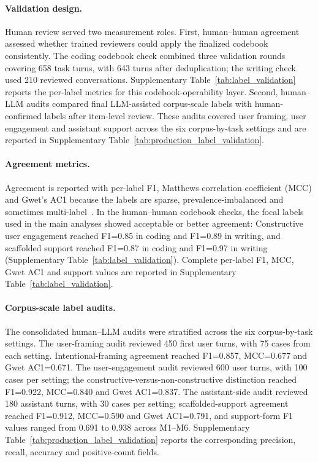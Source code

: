 \paragraph{Validation design.}
Human review served two measurement roles. First, human--human agreement assessed whether trained reviewers could apply the finalized codebook consistently. The coding codebook check combined three validation rounds covering 658 task turns, with 643 turns after deduplication; the writing check used 210 reviewed conversations. Supplementary Table~\ref{tab:label_validation} reports the per-label metrics for this codebook-operability layer. Second, human--LLM audits compared final LLM-assisted corpus-scale labels with human-confirmed labels after item-level review. These audits covered user framing, user engagement and assistant support across the six corpus-by-task settings and are reported in Supplementary Table~\ref{tab:production_label_validation}.

\paragraph{Agreement metrics.}
Agreement is reported with per-label F1, Matthews correlation coefficient (MCC) and Gwet's AC1 because the labels are sparse, prevalence-imbalanced and sometimes multi-label~\cite{matthews1975comparison,gwet2008computing}.  In the human--human codebook checks, the focal labels used in the main analyses showed acceptable or better agreement: Constructive user engagement reached F1=0.85 in coding and F1=0.89 in writing, and scaffolded support reached F1=0.87 in coding and F1=0.97 in writing (Supplementary Table~\ref{tab:label_validation}). Complete per-label F1, MCC, Gwet AC1 and support values are reported in Supplementary Table~\ref{tab:label_validation}.

\paragraph{Corpus-scale label audits.}
The consolidated human--LLM audits were stratified across the six corpus-by-task settings. The user-framing audit reviewed 450 first user turns, with 75 cases from each setting. Intentional-framing agreement reached F1=0.857, MCC=0.677 and Gwet AC1=0.671. The user-engagement audit reviewed 600 user turns, with 100 cases per setting; the constructive-versus-non-constructive distinction reached F1=0.922, MCC=0.840 and Gwet AC1=0.837. The assistant-side audit reviewed 180 assistant turns, with 30 cases per setting; scaffolded-support agreement reached F1=0.912, MCC=0.590 and Gwet AC1=0.791, and support-form F1 values ranged from 0.691 to 0.938 across M1--M6. Supplementary Table~\ref{tab:production_label_validation} reports the corresponding precision, recall, accuracy and positive-count fields.

